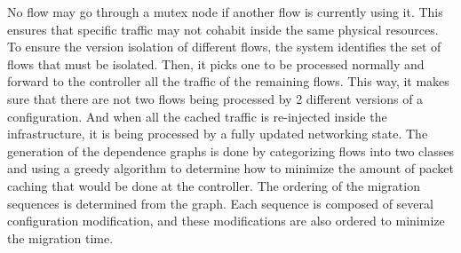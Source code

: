 No flow may go through a mutex node if another flow is currently using it.
This ensures that specific traffic may not cohabit inside the same physical resources.
To ensure the version isolation of different flows, the system identifies the set of flows that must be isolated. Then, it picks one to be processed normally and forward to the controller all the traffic of the remaining flows. This way, it makes sure that there are not two flows being processed by 2 different versions of a configuration. And when all the cached traffic is re-injected inside the infrastructure, it is being processed by a fully updated networking state.
The generation of the dependence graphs is done by categorizing flows into two classes and using a greedy algorithm to determine how to minimize the amount of packet caching that would be done at the controller.
The ordering of the migration sequences is determined from the graph. Each sequence is composed of several configuration modification, and these modifications are also ordered to minimize the migration time. 

